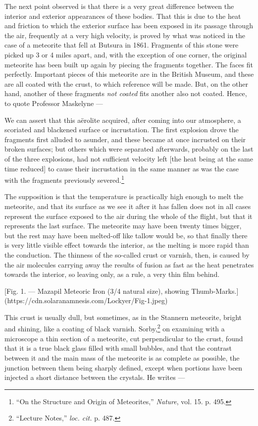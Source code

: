 \documentclass[a4paper, 12pt, oneside, polutonikogreek, english]{article}
\begin{document}
The next point observed is that there is a very great difference between the interior and exterior appearances of these bodies. That this is due to the heat and friction to which the exterior surface has been exposed in its passage through the air, frequently at a very high velocity, is proved by what was noticed in the case of a meteorite that fell at Butsura in 1861. Fragments of this stone were picked up 3 or 4 miles apart, and, with the exception of one corner, the original meteorite has been built up again by piecing the fragments together. The faces fit perfectly. Important pieces of this meteorite are in the British Museum, and these are all coated with the crust, to which reference will be made. But, on the other hand, another of these fragments \emph{not coated} fits another also not coated. Hence, to quote Professor Maskelyne ---

We can assert that this aërolite acquired, after coming into our atmosphere, a scoriated and blackened surface or incrustation. The first explosion drove the fragments first alluded to asunder, and these became at once incrusted on their broken surfaces; but others which were separated afterwards, probably on the last of the three explosions, had not sufficient velocity left [the heat being at the same time reduced] to cause their incrustation in the same manner as was the case with the fragments previously severed.\footnote{``On the Structure and Origin of Meteorites,'' \emph{Nature}, vol. 15. p. 495.}

The supposition is that the temperature is practically high enough to melt the meteorite, and that its surface as we see it after it has fallen does not in all cases represent the surface exposed to the air during the whole of the flight, but that it represents the last surface. The meteorite may have been twenty times bigger, but the rest may have been melted-off like tallow would be, so that finally there is very little visible effect towards the interior, as the melting is more rapid than the conduction. The thinness of the so-called crust or varnish, then, is caused by the air molecules carrying away the results of fusion as fast as the heat penetrates towards the interior, so leaving only, as a rule, a very thin film behind.

[Fig. 1. --- Mazapil Meteoric Iron (3/4 natural size), showing Thumb-Marks.](https://cdn.solaranamnesis.com/Lockyer/Fig-1.jpeg)

This crust is usually dull, but sometimes, as in the Stannern meteorite, bright and shining, like a coating of black varnish. Sorby,\footnote{``Lecture Notes,'' \emph{loc. cit.} p. 487.} on examining with a microscope a thin section of a meteorite, cut perpendicular to the crust, found that it is a true black glass filled with small bubbles, and that the contrast between it and the main mass of the meteorite is as complete as possible, the junction between them being sharply defined, except when portions have been injected a short distance between the crystals. He writes ---
\end{document}
